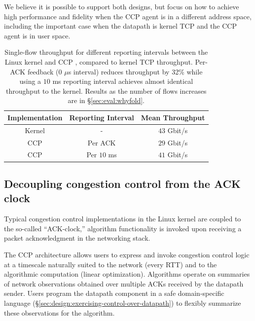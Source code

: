 We believe it is possible to support both designs, but focus on how to achieve high performance
and fidelity when the CCP agent is in a different address space, including the important
case when the datapath is kernel TCP and the CCP agent is in user space.




\begin{table}[]
    \centering
    \begin{tabular}{c|c|c}
        Implementation & Reporting Interval & Mean Throughput \\
        \hline
        Kernel & - & $43$ Gbit/s \\
        CCP & Per ACK & $29$ Gbit/s \\
        CCP & Per $10$ ms & $41$ Gbit/s \\
    \end{tabular}
    \caption{Single-flow throughput for different reporting intervals between
      the Linux kernel and CCP \userspace, compared to kernel TCP
      throughput. Per-ACK feedback (0 $\mu$s interval) reduces throughput by
      32\% while using a $10$ ms reporting interval
      achieves almost identical throughput to the kernel. Results as the number
      of flows  increases are in
      \S\ref{sec:eval:whyfold}.}\label{tab:perf:interval}
\end{table}

\subsection{Decoupling congestion control from the ACK clock}
\label{sec:design:decoupling-cc-from-ack-clock}

Typical congestion control
implementations in the Linux kernel are coupled to the so-called ``ACK-clock,''
\ie algorithm functionality is invoked upon receiving a packet acknowledgment in
the networking stack.

The CCP architecture allows users to express and invoke congestion control logic at a timescale naturally suited to the network (\eg every RTT) and to the algorithmic computation (\eg linear optimization).
%
Algorithms operate on summaries of network observations obtained over multiple ACKs received by the datapath sender.
%
Users program the datapath component in a safe domain-specific language (\S\ref{sec:design:exercising-control-over-datapath}) to flexibly summarize these observations for the algorithm.

